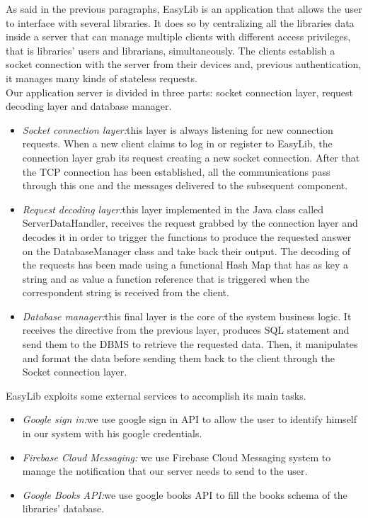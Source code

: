 As said in the previous paragraphs, EasyLib is an application that allows the user to interface with several libraries. It does so by centralizing all the libraries data inside a server that can manage multiple clients with different access privileges, that is libraries’ users and librarians, simultaneously. The clients establish a socket connection with the server from their devices and, previous authentication, it manages many kinds of stateless requests. \\
Our application server is divided in three parts: socket connection layer, request decoding layer and database manager.

\begin{itemize}
\item \emph{Socket connection layer:}this layer is always listening for new connection requests. When a new client claims to log in or register to EasyLib, the connection layer grab its request creating a new socket connection. After that the TCP connection has been established, all the communications pass through this one and the messages delivered to the subsequent component.
\item \emph{Request decoding layer:}this layer implemented in the Java class called ServerDataHandler, receives the request grabbed by the connection layer and decodes it in order to trigger the functions to produce the requested answer on the DatabaseManager class and take back their output. The decoding of the requests has been made using a functional Hash Map that has as key a string and as value a function reference that is triggered when the correspondent string is received from the client.
\item \emph{Database manager:}this final layer is the core of the system business logic. It receives the directive from the previous layer, produces SQL statement and send them to the DBMS to retrieve the requested data. Then, it manipulates and format the data before sending them back to the client through the Socket connection layer.
\end{itemize}


EasyLib exploits some external services to accomplish its main tasks.

\begin{itemize}
\item \emph{Google sign in:}we use google sign in API to allow the user to identify himself in our system with his google credentials.
\item \emph{Firebase Cloud Messaging: } we use Firebase Cloud Messaging system to manage the notification that our server needs to send to the user.
\item \emph{Google Books API:}we use google books API to fill the books schema of the libraries’ database.\\
\end{itemize}

